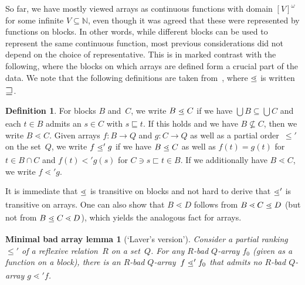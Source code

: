 \documentclass{amsart}
\numberwithin{theorem}{section}
\newtheorem*{min-bad-arr-lem}{Minimal bad array lemma}
\theoremstyle{definition}
\newtheorem{definition}[theorem]{Definition}
\newcommand\ledot{\mathrel{\ensurestackMath{%
  \stackengine{-.5ex}{\lessdot}{-}{U}{c}{F}{F}{S}}}}
\newcommand{\base}[1]{\textstyle\bigcup #1}
\begin{document}
So far, we have mostly viewed arrays as continuous functions with domain $[V]^\omega$ for some infinite $V\subseteq\mathbb N$, even though it was agreed that these were represented by functions on blocks. In other words, while different blocks can be used to represent the same continuous function, most previous considerations did not depend on the choice of representative. This is in marked contrast with the following, where the blocks on which arrays are defined form a crucial part of the data. We note that the following definitions are taken from~\cite{laver-min-array}, where $\ledot$ is written $\mathrel{\text{\scalebox{1.2}{$\sqsupseteq$}}}$.

\begin{definition}\label{def:lessdot}
For blocks $B$ and~$C$, we write $B\ledot C$ if we have $\base{B}\subseteq\base{C}$ and each $t\in B$ admits an $s\in C$ with $s\sqsubseteq t$. If this holds and we have $B\not\subseteq C$, then we write $B\lessdot C$. Given arrays $f:B\to Q$ and $g:C\to Q$ as well as a partial order~$\leq'$ on the set~$Q$, we write $f\ledot' g$ if we have $B\ledot C$ as well as $f(t)=g(t)$ for $t\in B\cap C$ and $f(t)<'g(s)$ for $C\ni s\sqsubset t\in B$. If we additionally have $B\lessdot C$, we write $f\lessdot' g$.
\end{definition}

It is immediate that $\ledot$ is transitive on blocks and not hard to derive that $\ledot'$ is transitive on arrays. One can also show that $B\lessdot D$ follows from $B\lessdot C\ledot D$ (but not from $B\ledot C\lessdot D$), which yields the analogous fact for arrays.

\begin{min-bad-arr-lem}[`Laver's version']
Consider a partial ranking $\leq'$ of a reflexive relation~$R$ on a set~$Q$. For any $R$-bad $Q$-array $f_0$ (given as a function on a block), there is an $R$-bad $Q$-array~$f\ledot' f_0$ that admits no $R$-bad $Q$-array $g\lessdot' f$.
\end{min-bad-arr-lem}
\end{document}
